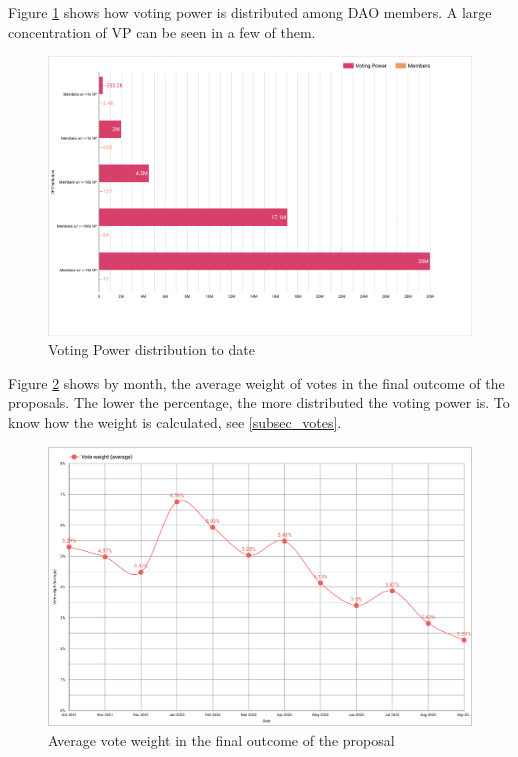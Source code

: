 \documentclass[MSE,Master,english]{twbook}%
\begin{document}
Figure \ref{fig:vp_distribution_members} shows how voting power is distributed among DAO members. A large concentration of VP can be seen in a few of them.
\begin{figure}[H]
  \centering
  \includegraphics[width=\textwidth]{metrics/vp_distribution_members.png}
  \caption{Voting Power distribution to date}
  \label{fig:vp_distribution_members}
\end{figure}

Figure \ref{fig:vote_weight} shows by month, the average weight of votes in the final outcome of the proposals. The lower the percentage, the more distributed the voting power is. To know how the weight is calculated, see \ref{subsec_votes}.
\begin{figure}[H]
  \centering
  \includegraphics[width=\textwidth]{metrics/vote_weight.png}
  \caption{Average vote weight in the final outcome of the proposal}
  \label{fig:vote_weight}
\end{figure}
\end{document}

